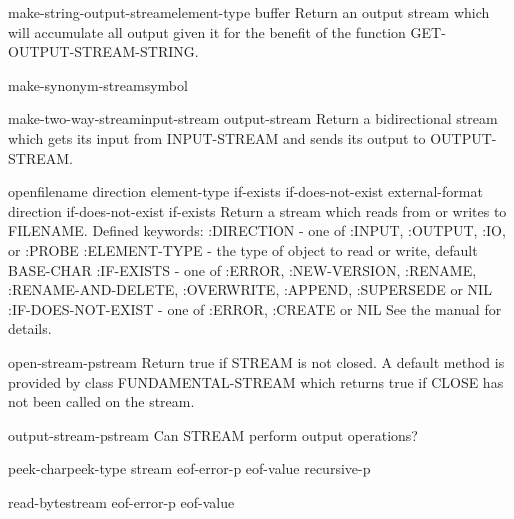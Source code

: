 \begin{function}{make-string-output-stream}{\key element-type \aux buffer}{}{}
  Return an output stream which will accumulate all output given it for the
benefit of the function GET-OUTPUT-STREAM-STRING.
\end{function}

\begin{function}{make-synonym-stream}{symbol}{}{}
  
\end{function}

\begin{function}{make-two-way-stream}{input-stream output-stream}{}{}
  Return a bidirectional stream which gets its input from INPUT-STREAM and
   sends its output to OUTPUT-STREAM.
\end{function}

\begin{function}{open}{filename \key direction element-type if-exists if-does-not-exist
 external-format \aux direction if-does-not-exist if-exists}{}{}
  Return a stream which reads from or writes to FILENAME.
  Defined keywords:
   :DIRECTION - one of :INPUT, :OUTPUT, :IO, or :PROBE
   :ELEMENT-TYPE - the type of object to read or write, default BASE-CHAR
   :IF-EXISTS - one of :ERROR, :NEW-VERSION, :RENAME, :RENAME-AND-DELETE,
                       :OVERWRITE, :APPEND, :SUPERSEDE or NIL
   :IF-DOES-NOT-EXIST - one of :ERROR, :CREATE or NIL
  See the manual for details.
\end{function}

\begin{function}{open-stream-p}{stream}{}{}
  Return true if STREAM is not closed. A default method is provided
  by class FUNDAMENTAL-STREAM which returns true if CLOSE has not been
  called on the stream.
\end{function}

\begin{function}{output-stream-p}{stream}{}{}
  Can STREAM perform output operations?
\end{function}

\begin{function}{peek-char}{\op peek-type stream eof-error-p eof-value recursive-p}{}{}
  
\end{function}

\begin{function}{read-byte}{stream \op eof-error-p eof-value}{}{}
  
\end{function}

